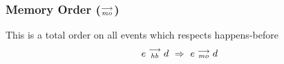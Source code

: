         \subsubsection{Memory Order ($\stackrel{\longrightarrow}{_\textit{mo}}$)}
            This is a total order on all events which respects happens-before
                \begin{align*}
                    e\stackrel{\longrightarrow}{_{\textit{hb}}}d \ \Rightarrow{} \ e\stackrel{\longrightarrow}{_{\textit{mo}}}d
                \end{align*}